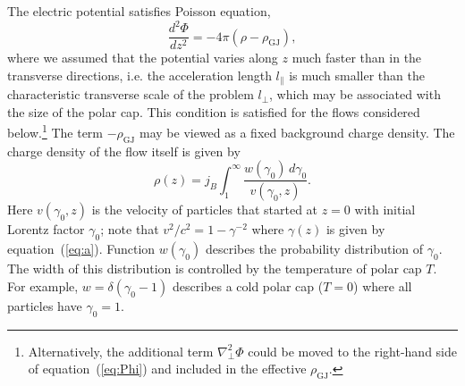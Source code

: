 The electric potential satisfies Poisson equation,
\begin{equation}
\label{eq:Phi}
    \frac{d^2\Phi}{dz^2}=-4\pi(\rho-\rho_\mathrm{GJ}),
\end{equation}
where we assumed that the potential varies along $z$ much faster than in
the transverse directions, i.e. the acceleration length $l_\parallel$ is much smaller
than the characteristic transverse scale of the problem $l_\perp$, which may be
associated with the size of the polar cap. This condition is satisfied for the flows considered below.\footnote{
      Alternatively, the additional term $\nabla_\perp^2\Phi$ could be moved to the
      right-hand side of equation~(\ref{eq:Phi}) and included in the effective $\rho_\mathrm{GJ}$.}
The term $-\rho_\mathrm{GJ}$ may be viewed as a fixed background charge density.
The charge density of the flow itself is given by
\begin{equation}
     \rho(z)=j_B \int_1^{\infty} \frac{w(\gamma_0)\,d\gamma_0}{v(\gamma_0,z)}.
\end{equation}
Here $v(\gamma_0,z)$ is the velocity of particles that started at $z=0$
with initial Lorentz factor $\gamma_0$; note that $v^2/c^2=1-\gamma^{-2}$ where
$\gamma(z)$ is given by equation~(\ref{eq:a}).
Function $w(\gamma_0)$ describes the probability distribution of $\gamma_0$.
The width of this distribution is controlled by the temperature of polar cap $T$.
For example, $w=\delta(\gamma_0-1)$ describes a cold polar cap ($T=0$) where
all particles have $\gamma_0=1$.

